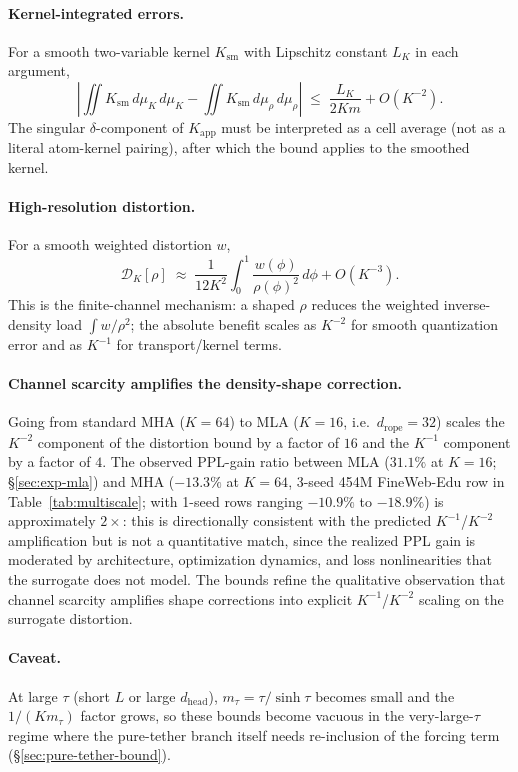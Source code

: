 \paragraph{Kernel-integrated errors.} For a smooth two-variable kernel $K_{\mathrm{sm}}$ with Lipschitz constant $L_K$ in each argument,
\begin{equation}
\left|\iint K_{\mathrm{sm}}\,d\mu_K\,d\mu_K - \iint K_{\mathrm{sm}}\,d\mu_\rho\,d\mu_\rho\right| \;\le\; \frac{L_K}{2Km} + O(K^{-2}).
\label{eq:kernel-bound}
\end{equation}
The singular $\delta$-component of $K_{\mathrm{app}}$ must be interpreted as a cell average (not as a literal atom-kernel pairing), after which the bound applies to the smoothed kernel.

\paragraph{High-resolution distortion.} For a smooth weighted distortion $w$,
\begin{equation}
\mathcal{D}_K[\rho] \;\approx\; \frac{1}{12K^2}\int_0^1 \frac{w(\phi)}{\rho(\phi)^2}\,d\phi + O(K^{-3}).
\label{eq:high-res-distortion}
\end{equation}
This is the finite-channel mechanism: a shaped $\rho$ reduces the weighted inverse-density load $\int w/\rho^2$; the absolute benefit scales as $K^{-2}$ for smooth quantization error and as $K^{-1}$ for transport/kernel terms.

\paragraph{Channel scarcity amplifies the density-shape correction.} Going from standard MHA ($K{=}64$) to MLA ($K{=}16$, i.e.\ $d_{\mathrm{rope}}{=}32$) scales the $K^{-2}$ component of the distortion bound by a factor of $16$ and the $K^{-1}$ component by a factor of $4$. The observed PPL-gain ratio between MLA ($31.1\%$ at $K{=}16$; \S\ref{sec:exp-mla}) and MHA ($-13.3\%$ at $K{=}64$, 3-seed 454M FineWeb-Edu row in Table~\ref{tab:multiscale}; with 1-seed rows ranging $-10.9\%$ to $-18.9\%$) is approximately $2{\times}$: this is directionally consistent with the predicted $K^{-1}$/$K^{-2}$ amplification but is not a quantitative match, since the realized PPL gain is moderated by architecture, optimization dynamics, and loss nonlinearities that the surrogate does not model. The bounds refine the qualitative observation that channel scarcity amplifies shape corrections into explicit $K^{-1}$/$K^{-2}$ scaling on the surrogate distortion.

\paragraph{Caveat.} At large $\tau$ (short $L$ or large $d_{\mathrm{head}}$), $m_\tau{=}\tau/\sinh\tau$ becomes small and the $1/(Km_\tau)$ factor grows, so these bounds become vacuous in the very-large-$\tau$ regime where the pure-tether branch itself needs re-inclusion of the forcing term (\S\ref{sec:pure-tether-bound}).
